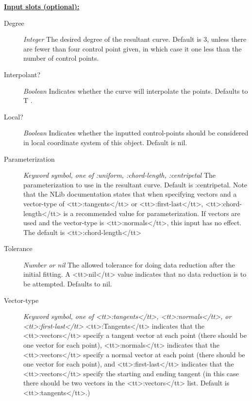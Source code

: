 \documentclass [11pt]{book}
\begin{document}
\begin{itemize}
\textbf{
\underline{Input slots (optional):}}

\begin{description}

\item [Degree]
\emph{Integer} The desired degree of the resultant curve. Default is 3, unless there are fewer than four control point given,
in which case it one less than the number of control points.


\item [Interpolant?]
\emph{Boolean} Indicates whether the curve will interpolate the points. Defaults to T .


\item [Local?]
\emph{Boolean} Indicates whether the inputted control-points should be considered in local coordinate system of this object. Default is nil.


\item [Parameterization]
\emph{Keyword symbol, one of :uniform, :chord-length, :centripetal} The parameterization to use in the resultant curve.
Default is :centripetal. Note that the NLib documentation states that when specifying vectors and a vector-type of <tt>:tangents</tt>
or <tt>:first-last</tt>, <tt>:chord-length</tt> is a recommended value for parameterization. If vectors are used and the vector-type
is <tt>:normals</tt>, this input has no effect. The default is <tt>:chord-length</tt>


\item [Tolerance]
\emph{Number or nil} The allowed tolerance for doing data reduction after the initial fitting.
A <tt>nil</tt> value indicates that no data reduction is to be attempted. Defaults to nil.


\item [Vector-type]
\emph{Keyword symbol, one of <tt>:tangents</tt>, <tt>:normals</tt>, or <tt>:first-last</tt>} <tt>:Tangents</tt> indicates that the <tt>:vectors</tt> specify
a tangent vector at each point (there should be one vector for each point),
<tt>:normals</tt> indicates that the <tt>:vectors</tt> specify a normal vector at each
point (there should be one vector for each point), and
<tt>:first-last</tt> indicates that the <tt>:vectors</tt> specify the starting and ending
tangent (in this case there should be two vectors in the <tt>:vectors</tt> list. Default is <tt>:tangents</tt>.)



\end{description}
\end{itemize}
\end{document}
